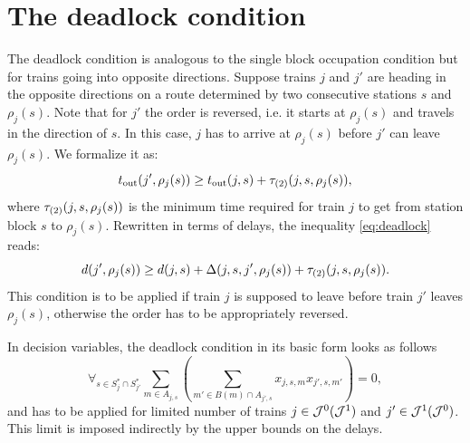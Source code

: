 \section{The deadlock condition}
The deadlock condition is analogous to the single block occupation condition but for
trains going into opposite directions. Suppose trains $j$ and $j'$ are heading in the opposite
directions on a route determined by two consecutive stations
$s$ and $\rho_j(s)$. Note that for $j'$ the order is reversed, i.e. it starts at $\rho_j(s)$ and
travels in the direction of $s$. In this case, $j$ has to arrive at $\rho_j(s)$ before $j'$ can
leave $\rho_j(s)$. We formalize it as:
\begin{equation}
  \label{eq:deadlock}
  t_\text{out}(j', \rho_j(s)) \ge t_\text{out}(j,s) + \tau_{(2)}(j, s, \rho_j(s)),
\end{equation}
where $\tau_{(2)}(j, s, \rho_j(s))$ is the minimum time required for train $j$ to get from station
block $s$ to $\rho_{j}(s)$.
Rewritten in terms of delays, the inequality \eqref{eq:deadlock} reads:
\begin{equation}
  \label{eq:deadlock2}
  d(j',\rho_j(s)) \ge d(j, s) + \Delta(j,s,j',\rho_j(s)) + \tau_{(2)}(j, s, \rho_j(s)).
\end{equation}
This condition is to be applied if train $j$ is supposed to leave before train $j'$ leaves
$\rho_{j}(s)$, otherwise the order has to be appropriately reversed.

In decision variables, the deadlock condition in its basic form looks as follows
\begin{equation}
  \label{eq:qubo:deadlock}
  \forall_{s \in S^{*}_{j} \cap S^{*}_{j'}} \sum_{m \in A_{j, s}} \left(
    \sum_{m' \in B(m) \cap A_{j', s}} x_{j,s,m}x_{j',s,m'}
  \right) = 0,
\end{equation}
and has to be applied for limited number of trains $j \in \mathcal{J}^{0} (\mathcal{J}^{1})$ and $j' \in \mathcal{J}^{1}(\mathcal{J}^{0})$.
This limit is imposed indirectly by the upper bounds on the delays.

